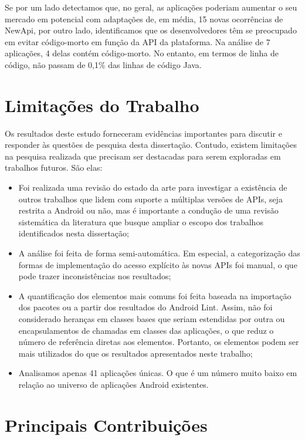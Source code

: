 Se por um lado detectamos que, no geral, as aplicações poderiam aumentar o seu mercado
em potencial com adaptações de, em média, 15 novas ocorrências de NewApi,  por outro
lado, identificamos que os desenvolvedores têm se preocupado em evitar código-morto
em função da API da plataforma. Na análise de 7 aplicações, 4 delas contém código-morto.
No entanto, em termos de linha de código, não passam de 0,1\% das linhas de código Java.

\section{Limitações do Trabalho}\label{sec:limitacoes}

Os resultados deste estudo forneceram evidências importantes para discutir e responder
às questões de pesquisa desta dissertação. Contudo, existem limitações na pesquisa
realizada que precisam ser destacadas para serem exploradas em trabalhos futuros.
São elas:

\begin{itemize}
	\item Foi realizada uma revisão do estado da arte para investigar a existência de
		outros trabalhos que lidem com suporte a múltiplas versões de APIs, seja restrita
		a Android ou não, mas é importante a condução de uma revisão sistemática da
		literatura que busque ampliar o escopo dos trabalhos identificados nesta dissertação;
	\item A análise foi feita de forma semi-automática. Em especial, a categorização
		das formas de implementação do acesso explícito às novas APIs foi manual, o que
		pode trazer inconsistências nos resultados;
	\item A quantificação dos elementos mais comuns foi feita baseada na importação dos
		pacotes ou a partir dos resultados do Android Lint. Assim, não foi considerado
		heranças em classes bases que seriam estendidas por outra ou encapsulamentos de
		chamadas em classes das aplicações, o que reduz o número de referência diretas aos 
		elementos.  Portanto, os elementos podem ser mais utilizados do que os resultados 
		apresentados neste trabalho;
	\item Analisamos apenas 41 aplicações únicas. O que é um número muito baixo em relação
		ao universo de aplicações Android existentes.
\end{itemize}

\section{Principais Contribuições}\label{sec:contribuicoes}

